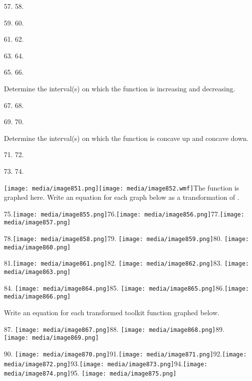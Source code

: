 57. 58.

59. 60.

61. 62.

63. 64.

65. 66.

Determine the interval(s) on which the function is increasing and
decreasing.

67. 68.

69. 70.

Determine the interval(s) on which the function is concave up and
concave down.

71. 72.

73. 74.

\texttt{[image: media/image851.png]}\texttt{[image: media/image852.wmf]}The
function is graphed here. Write an equation for each graph below as a
transformation of .

75.\texttt{[image: media/image855.png]}76.\texttt{[image: media/image856.png]}77.\texttt{[image: media/image857.png]}

78.\texttt{[image: media/image858.png]}79.
\texttt{[image: media/image859.png]}80.
\texttt{[image: media/image860.png]}

81.\texttt{[image: media/image861.png]}82.
\texttt{[image: media/image862.png]}83.
\texttt{[image: media/image863.png]}

84.
\texttt{[image: media/image864.png]}85.
\texttt{[image: media/image865.png]}86.\texttt{[image: media/image866.png]}

Write an equation for each transformed toolkit function graphed below.

87.
\texttt{[image: media/image867.png]}88.
\texttt{[image: media/image868.png]}89.
\texttt{[image: media/image869.png]}

90.
\texttt{[image: media/image870.png]}91.\texttt{[image: media/image871.png]}92.\texttt{[image: media/image872.png]}93.\texttt{[image: media/image873.png]}94.\texttt{[image: media/image874.png]}95.
\texttt{[image: media/image875.png]}

